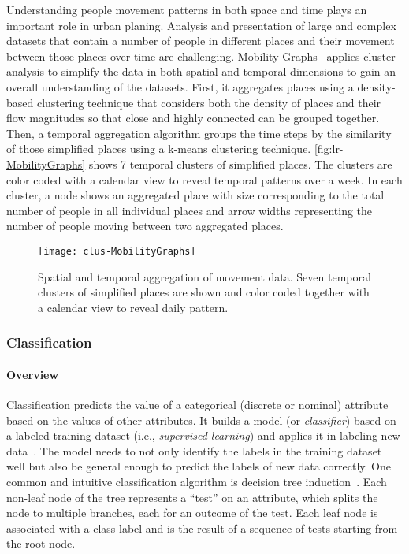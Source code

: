 Understanding people movement patterns in both space and time plays an important role in urban planing. Analysis and presentation of large and complex datasets that contain a number of people in different places and their movement between those places over time are challenging. Mobility Graphs~\cite{Landesberger2016} applies cluster analysis to simplify the data in both spatial and temporal dimensions to gain an overall understanding of the datasets. First, it aggregates places using a density-based clustering technique that considers both the density of places and their flow magnitudes so that close and highly connected can be grouped together. Then, a temporal aggregation algorithm groups the time steps by the similarity of those simplified places using a k-means clustering technique. \autoref{fig:lr-MobilityGraphs} shows 7 temporal clusters of simplified places. The clusters are color coded with a calendar view to reveal temporal patterns over a week. In each cluster, a node shows an aggregated place with size corresponding to the total number of people in all individual places and arrow widths representing the number of people moving between two aggregated places.

\begin{figure}[!htb]
	\centering
	\texttt{[image: clus-MobilityGraphs]}
	\caption{Spatial and temporal aggregation of movement data. Seven temporal clusters of simplified places are shown and color coded together with a calendar view to reveal daily pattern. }
	\label{fig:lr-MobilityGraphs}
\end{figure}

\subsubsection{Classification}
\paragraph{Overview}
Classification predicts the value of a categorical (discrete or nominal) attribute based on the values of other attributes. It builds a model (or \emph{classifier}) based on a labeled training dataset (i.e., \emph{supervised learning}) and applies it in labeling new data~\cite{Han2011}. The model needs to not only identify the labels in the training dataset well but also be general enough to predict the labels of new data correctly. One common and intuitive classification algorithm is decision tree induction~\cite{Quinlan1986}. Each non-leaf node of the tree represents a ``test'' on an attribute, which splits the node to multiple branches, each for an outcome of the test. Each leaf node is associated with a class label and is the result of a sequence of tests starting from the root node.

